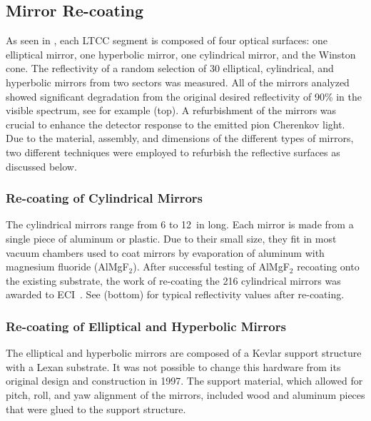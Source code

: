 \subsection{Mirror Re-coating}

As seen in , each LTCC segment is composed of four optical surfaces: one elliptical mirror, one hyperbolic
mirror, one cylindrical mirror, and the Winston cone. The reflectivity of a random selection of 30 elliptical, cylindrical,
and hyperbolic mirrors from two sectors was measured. All of the mirrors analyzed showed significant degradation
from the original desired reflectivity of 90\% in the visible spectrum, see for example 
(top). A refurbishment of the mirrors was crucial to enhance the detector response to the emitted pion Cherenkov
light. Due to the material, assembly, and dimensions of the different types of mirrors, two different techniques were
employed to refurbish the reflective surfaces as discussed below.

\subsubsection{Re-coating of Cylindrical Mirrors}

The cylindrical mirrors range from 6 to 12~in long. Each mirror is made from a single piece of aluminum or plastic. Due
to their small size, they fit in most vacuum chambers used to coat mirrors by evaporation of aluminum with magnesium
fluoride (AlMgF$_2$). After successful testing of AlMgF$_2$ recoating onto the existing substrate, the work of
re-coating the 216 cylindrical mirrors was awarded to ECI~\cite{ECI}. See  (bottom)
for typical reflectivity values after re-coating.

\subsubsection{Re-coating of Elliptical and Hyperbolic Mirrors}

The elliptical and hyperbolic mirrors are composed of a Kevlar support structure with a Lexan substrate. It was not
possible to change this hardware from its original design and construction in 1997. The support material, which allowed
for pitch, roll, and yaw alignment of the mirrors, included wood and aluminum pieces that were glued to the support
structure.

